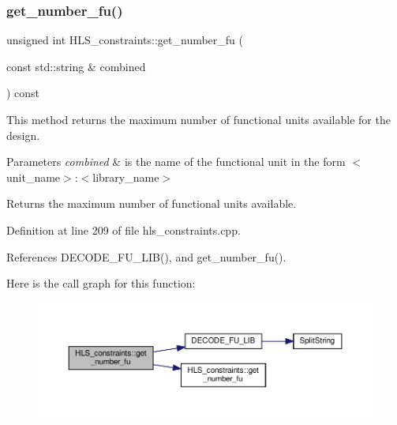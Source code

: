 \subsubsection{\texorpdfstring{get\+\_\+number\+\_\+fu()}{get\_number\_fu()}\hspace{0.1cm}{\footnotesize\ttfamily [2/2]}}
{\footnotesize\ttfamily unsigned int H\+L\+S\+\_\+constraints\+::get\+\_\+number\+\_\+fu (\begin{DoxyParamCaption}\item[{const std\+::string \&}]{combined }\end{DoxyParamCaption}) const}



This method returns the maximum number of functional units available for the design. 


\begin{DoxyParams}{Parameters}
{\em combined} & is the name of the functional unit in the form $<$unit\+\_\+name$>$\+:$<$library\+\_\+name$>$ \\
\hline
\end{DoxyParams}
\begin{DoxyReturn}{Returns}
the maximum number of functional units available. 
\end{DoxyReturn}


Definition at line 209 of file hls\+\_\+constraints.\+cpp.



References D\+E\+C\+O\+D\+E\+\_\+\+F\+U\+\_\+\+L\+I\+B(), and get\+\_\+number\+\_\+fu().

Here is the call graph for this function\+:
\nopagebreak
\begin{figure}[H]
\begin{center}
\leavevmode
\includegraphics[width=350pt]{dd/d96/classHLS__constraints_a6add734962a7ab1a103e95e9bb87cc30_cgraph}
\end{center}
\end{figure}
\mbox{\label{classHLS__constraints_af14fb287ca33eee91e03223daa631cc3}} 
